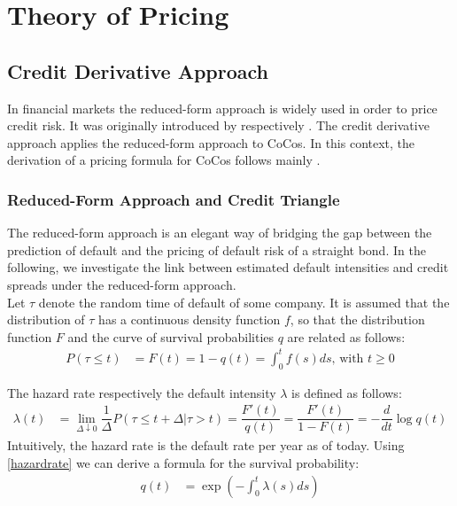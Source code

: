 \chapter{Theory of Pricing}

\section{Credit Derivative Approach} \label{sec:creditderivativeapproach}

In financial markets the reduced-form approach is widely used in order to price credit risk. It was originally introduced by \citet{jarrow1995pricing} respectively \citet{duffie1999modeling}. The credit derivative approach applies the reduced-form approach to CoCos. In this context, the derivation of a pricing formula for CoCos follows mainly \citet{de2011pricing}. 

\subsection{Reduced-Form Approach and Credit Triangle}

The reduced-form approach is an elegant way of bridging the gap between the prediction of default and the pricing of default risk of a straight bond. In the following, we investigate the link between estimated default intensities and credit spreads under the reduced-form approach. \citep{lando2009credit}\\

Let $\tau$ denote the random time of default of some company. It is assumed that the distribution of $\tau$ has a continuous density function $f$, so that the distribution function $F$ and the curve of survival probabilities $q$ are related as follows:  
\begin{align}
P(\tau \leq t) &= F(t) = 1 - q(t) = \int_0^t f(s) ds \text{, with } t \geq 0
\end{align}

The hazard rate respectively the default intensity $\lambda$ is defined as follows:
\begin{align} \label{hazardrate}
\lambda(t) &= \lim_{\Delta \downarrow 0} \dfrac{1}{\Delta} P(\tau \leq t + \Delta | \tau > t) = \dfrac{F'(t)}{q(t)} = \dfrac{F'(t)}{1 - F(t)} = - \dfrac{d}{dt} \log q(t)
\end{align}
Intuitively, the hazard rate is the default rate per year as of today. Using \ref{hazardrate} we can derive a formula for the survival probability:
\begin{align}
q(t) &= \exp \left(- \int_0^t \lambda (s) ds \right)
\end{align}


